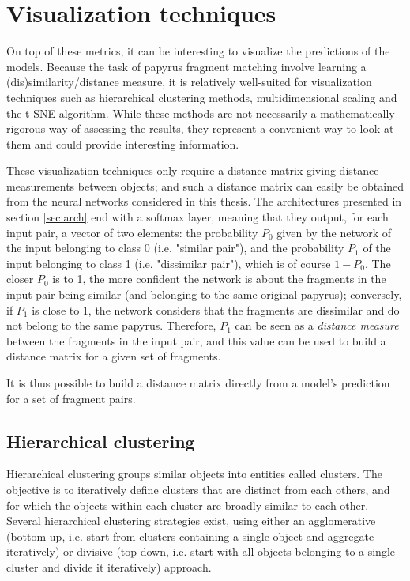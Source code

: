 \documentclass[11pt]{report}
\begin{document}
\section{Visualization techniques}

On top of these metrics, it can be interesting to visualize the predictions of the models. Because the task of papyrus fragment matching involve learning a (dis)similarity/distance measure, it is relatively well-suited for visualization techniques such as hierarchical clustering methods, multidimensional scaling and the t-SNE algorithm. While these methods are not necessarily a mathematically rigorous way of assessing the results, they represent a convenient way to look at them and could provide interesting information.\newline

These visualization techniques only require a distance matrix giving distance measurements between objects; and such a distance matrix can easily be obtained from the neural networks considered in this thesis.\newline
The architectures presented in section \ref{sec:arch} end with a softmax layer, meaning that they output, for each input pair, a vector of two elements: the probability $P_0$ given by the network of the input belonging to class 0 (i.e. "similar pair"), and the probability $P_1$ of the input belonging to class 1 (i.e. "dissimilar pair"), which is of course $1 - P_0$.\newline
The closer $P_0$ is to 1, the more confident the network is about the fragments in the input pair being similar (and belonging to the same original papyrus); conversely, if $P_1$ is close to 1, the network considers that the fragments are dissimilar and do not belong to the same papyrus. Therefore, $P_1$ can be seen as a \emph{distance measure} between the fragments in the input pair, and this value can be used to build a distance matrix for a given set of fragments.\newline

It is thus possible to build a distance matrix directly from a model's prediction for a set of fragment pairs.\newline


\subsection{Hierarchical clustering}

Hierarchical clustering groups similar objects into entities called clusters. The objective is to iteratively define clusters that are distinct from each others, and for which the objects within each cluster are broadly similar to each other.\newline
Several hierarchical clustering strategies exist, using either an agglomerative (bottom-up, i.e. start from clusters containing a single object and aggregate iteratively) or divisive (top-down, i.e. start with all objects belonging to a single cluster and divide it iteratively) approach.
\end{document}
